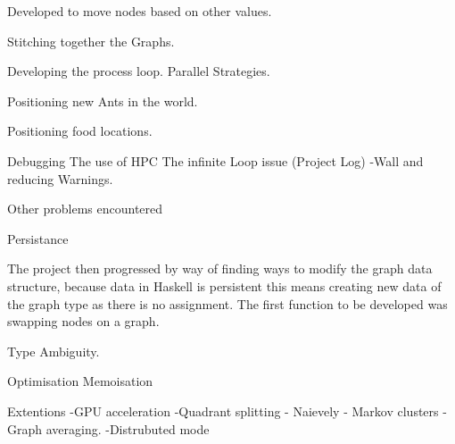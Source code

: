 \documentclass[main.tex]{subfiles}
\begin{document}
Developed to move nodes based on other values.

Stitching together the Graphs.

Developing the process loop. Parallel Strategies.

Positioning new Ants in the world.

Positioning food locations.

Debugging
The use of HPC
The infinite Loop issue (Project Log)
-Wall and reducing Warnings.

Other problems encountered

Persistance

The project then progressed by way of finding ways to modify the graph data structure, because data in Haskell is persistent this means creating new data of the graph type as there is no assignment. The first function to be developed was swapping nodes on a graph. 

Type Ambiguity.

Optimisation
Memoisation

Extentions
-GPU acceleration
-Quadrant splitting - Naievely - Markov clusters - Graph averaging.
-Distrubuted mode
\end{document}
